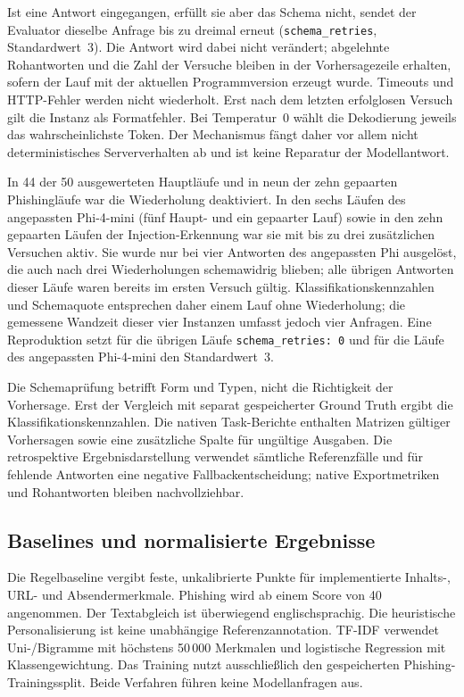 \documentclass[12pt,twoside=false,a4paper,parskip]{scrbook}
\begin{document}
Ist eine Antwort eingegangen, erfüllt sie aber das Schema nicht, sendet der Evaluator dieselbe Anfrage bis zu dreimal erneut (\texttt{schema\_retries}, Standardwert~3). Die Antwort wird dabei nicht verändert; abgelehnte Rohantworten und die Zahl der Versuche bleiben in der Vorhersagezeile erhalten, sofern der Lauf mit der aktuellen Programmversion erzeugt wurde. Timeouts und HTTP-Fehler werden nicht wiederholt. Erst nach dem letzten erfolglosen Versuch gilt die Instanz als Formatfehler. Bei Temperatur~0 wählt die Dekodierung jeweils das wahrscheinlichste Token. Der Mechanismus fängt daher vor allem nicht deterministisches Serververhalten ab und ist keine Reparatur der Modellantwort.

In 44 der 50 ausgewerteten Hauptläufe und in neun der zehn gepaarten Phishingläufe war die Wiederholung deaktiviert. In den sechs Läufen des angepassten Phi-4-mini (fünf Haupt- und ein gepaarter Lauf) sowie in den zehn gepaarten Läufen der Injection-Erkennung war sie mit bis zu drei zusätzlichen Versuchen aktiv. Sie wurde nur bei vier Antworten des angepassten Phi ausgelöst, die auch nach drei Wiederholungen schemawidrig blieben; alle übrigen Antworten dieser Läufe waren bereits im ersten Versuch gültig. Klassifikationskennzahlen und Schemaquote entsprechen daher einem Lauf ohne Wiederholung; die gemessene Wandzeit dieser vier Instanzen umfasst jedoch vier Anfragen. Eine Reproduktion setzt für die übrigen Läufe \texttt{schema\_retries: 0} und für die Läufe des angepassten Phi-4-mini den Standardwert~3.

Die Schemaprüfung betrifft Form und Typen, nicht die Richtigkeit der Vorhersage. Erst der Vergleich mit separat gespeicherter Ground Truth ergibt die Klassifikationskennzahlen. Die nativen Task-Berichte enthalten Matrizen gültiger Vorhersagen sowie eine zusätzliche Spalte für ungültige Ausgaben. Die retrospektive Ergebnisdarstellung verwendet sämtliche Referenzfälle und für fehlende Antworten eine negative Fallbackentscheidung; native Exportmetriken und Rohantworten bleiben nachvollziehbar.

\subsection{Baselines und normalisierte Ergebnisse}

Die Regelbaseline vergibt feste, unkalibrierte Punkte für implementierte Inhalts-, URL- und Absendermerkmale. Phishing wird ab einem Score von 40 angenommen. Der Textabgleich ist überwiegend englischsprachig. Die heuristische Personalisierung ist keine unabhängige Referenzannotation. TF-IDF verwendet Uni-/Bigramme mit höchstens 50\,000 Merkmalen und logistische Regression mit Klassengewichtung. Das Training nutzt ausschließlich den gespeicherten Phishing-Trainingssplit. Beide Verfahren führen keine Modellanfragen aus.
\end{document}
